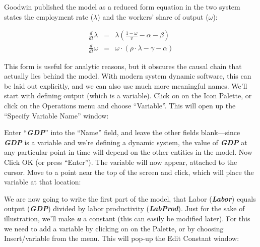 \begin{itemize}
Goodwin published the model as a reduced form equation in the two
system states the employment rate ($\lambda$) and the workers' share
of output ($\omega$): 

\begin{eqnarray*}
\frac{d}{dt}\lambda&=&\lambda\left(\frac{1-\omega}{v}-\alpha-\beta\right)\\
\frac{d}{dt}\omega&=&\omega\cdot\left(\rho\cdot\lambda-\gamma-\alpha\right)
\end{eqnarray*}

\end{itemize}

This form is useful for analytic reasons, but it obscures the causal
chain that actually lies behind the model. With modern system dynamic
software, this can be laid out explicitly, and we can also use much
more meaningful names. We'll start with defining output (which is a
variable). Click on  on the Icon Palette, or click on the Operations
menu and choose ``Variable''. This will open up the ``Specify Variable
Name'' window: 

\begin{center}
\end{center}

Enter ``{\em\bf GDP}'' into the ``Name'' field, and leave the other
fields blank---since {\em\bf GDP} is a variable and we're defining a
dynamic system, the value of {\em\bf GDP} at any particular point in
time will depend on the other entities in the model. Now Click OK (or
press ``Enter''). The variable will now appear, attached to the
cursor. Move to a point near the top of the screen and click, which
will place the variable at that location:

\begin{center}
\end{center}


We are now going to write the first part of the model, that Labor
({\em\bf Labor}) equals output ({\em\bf GDP}) divided by labor
productivity ({\em\bf LabProd}). Just for the sake of illustration,
we'll make {\em\bf a} a constant (this can easily be modified
later). For this we need to add a variable by clicking on  on the
Palette, or by choosing Insert/variable from the menu. This will
pop-up the Edit Constant window: 

\begin{center}
\end{center}

